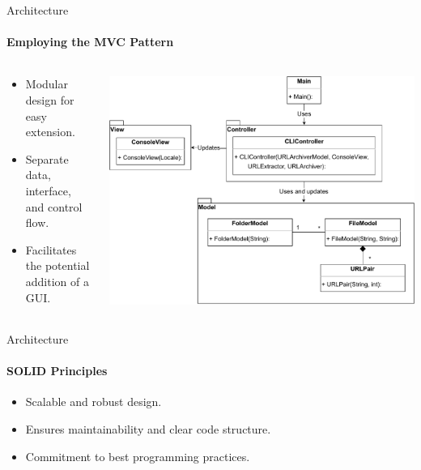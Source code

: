 \documentclass[
    ngerman,%
    authorontitle=true,
]{bfhbeamer}
\begin{document}
    \begin{frame}{Architecture}
        \framesubtitle{Employing the MVC Pattern}

        \begin{columns} %
            \begin{column}{0.5\textwidth} %
                \begin{itemize}
                    \item Modular design for easy extension.
                    \item Separate data, interface, and control flow.
                    \item Facilitates the potential addition of a GUI.
                \end{itemize}
            \end{column}

            \begin{column}{0.5\textwidth} %
                \includegraphics[width=1\textwidth]{pictures/mvc_diagram-Detailed}
            \end{column}
        \end{columns} %
    \end{frame}

    \begin{frame}{Architecture}
        \framesubtitle{SOLID Principles}
        \begin{itemize}
            \item Scalable and robust design.
            \item Ensures maintainability and clear code structure.
            \item Commitment to best programming practices.
        \end{itemize}
    \end{frame}
\end{document}
